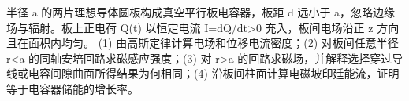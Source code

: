 半径 a 的两片理想导体圆板构成真空平行板电容器，板距 d 远小于 a，忽略边缘场与辐射。板上正电荷 Q(t) 以恒定电流 I=dQ/dt>0 充入，板间电场沿正 z 方向且在面积内均匀。
(1) 由高斯定律计算电场和位移电流密度；(2) 对板间任意半径 r<a 的同轴安培回路求磁感应强度；(3) 对 r>a 的回路求磁场，并解释选择穿过导线或电容间隙曲面所得结果为何相同；(4) 沿板间柱面计算电磁坡印廷能流，证明等于电容器储能的增长率。
